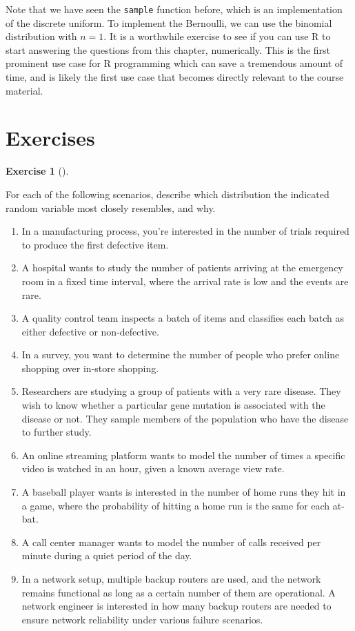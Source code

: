\documentclass[
  letterpaper,
  DIV=11,
  numbers=noendperiod]{scrreprt}
\providecommand{\tightlist}{%
  \setlength{\itemsep}{0pt}\setlength{\parskip}{0pt}}\usepackage{longtable,booktabs,array}
\theoremstyle{definition}
\newtheorem{exercise}{Exercise}[chapter]
\theoremstyle{definition}
\theoremstyle{definition}
\theoremstyle{remark}
\begin{document}
Note that we have seen the \texttt{sample} function before, which is an
implementation of the discrete uniform. To implement the Bernoulli, we
can use the binomial distribution with \(n=1\). It is a worthwhile
exercise to see if you can use R to start answering the questions from
this chapter, numerically. This is the first prominent use case for R
programming which can save a tremendous amount of time, and is likely
the first use case that becomes directly relevant to the course
material.

\section*{Exercises}\label{exercises-6}


\begin{exercise}[]\protect\hypertarget{exr-8.1}{}\label{exr-8.1}

For each of the following scenarios, describe which distribution the
indicated random variable most closely resembles, and why.

\begin{enumerate}
\def\labelenumi{\alph{enumi}.}
\tightlist
\item
  In a manufacturing process, you're interested in the number of trials
  required to produce the first defective item.
\item
  A hospital wants to study the number of patients arriving at the
  emergency room in a fixed time interval, where the arrival rate is low
  and the events are rare.
\item
  A quality control team inspects a batch of items and classifies each
  batch as either defective or non-defective.
\item
  In a survey, you want to determine the number of people who prefer
  online shopping over in-store shopping.
\item
  Researchers are studying a group of patients with a very rare disease.
  They wish to know whether a particular gene mutation is associated
  with the disease or not. They sample members of the population who
  have the disease to further study.
\item
  An online streaming platform wants to model the number of times a
  specific video is watched in an hour, given a known average view rate.
\item
  A baseball player wants is interested in the number of home runs they
  hit in a game, where the probability of hitting a home run is the same
  for each at-bat.
\item
  A call center manager wants to model the number of calls received per
  minute during a quiet period of the day.
\item
  In a network setup, multiple backup routers are used, and the network
  remains functional as long as a certain number of them are
  operational. A network engineer is interested in how many backup
  routers are needed to ensure network reliability under various failure
  scenarios.
\end{enumerate}

\end{exercise}
\end{document}
